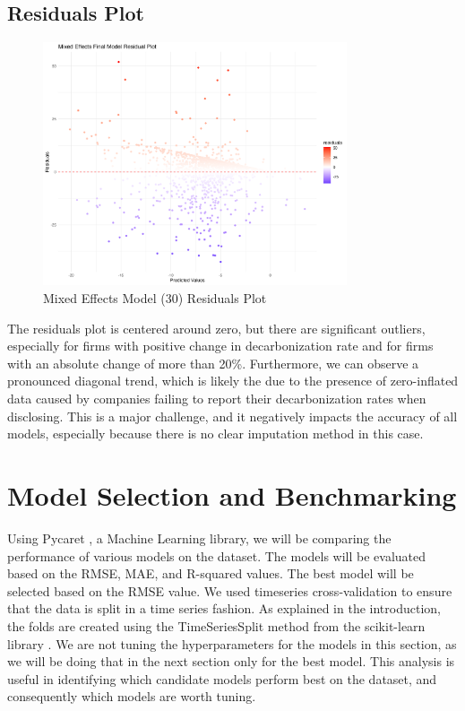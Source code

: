 \subsection{Residuals Plot}
\begin{figure}[H]
    \centering
    \includegraphics[width=0.8\textwidth]{figures/final_model_residuals.png}
    \caption{Mixed Effects Model (30) Residuals Plot}
    \label{fig:mixed_effects_residuals}
\end{figure}
\noindent The residuals plot is centered around zero, but there are significant outliers, especially for firms with positive change in decarbonization rate and for firms with an absolute change of more than 20\%. Furthermore, we can observe a pronounced diagonal trend, which is likely the due to the presence of zero-inflated data caused by companies failing to report their decarbonization rates when disclosing. This is a major challenge, and it negatively impacts the accuracy of all models, especially because there is no clear imputation method in this case.

\section{Model Selection and Benchmarking}
Using Pycaret \cite{pycaret}, a Machine Learning library, we will be comparing the performance of various models on the dataset. The models will be evaluated based on the RMSE, MAE, and R-squared values. The best model will be selected based on the RMSE value. We used timeseries cross-validation to ensure that the data is split in a time series fashion. As explained in the introduction, the folds are created using the TimeSeriesSplit method from the scikit-learn library \cite{scikit-learn}. We are not tuning the hyperparameters for the models in this section, as we will be doing that in the next section only for the best model. This analysis is useful in identifying which candidate models perform best on the dataset, and consequently which models are worth tuning.

